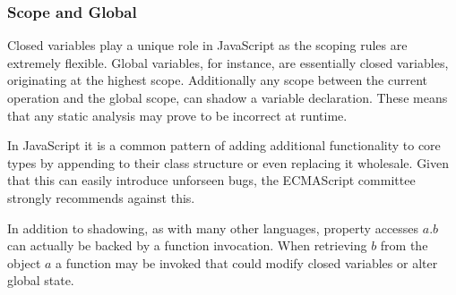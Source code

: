 \subsubsection{Scope and Global}

Closed variables play a unique role in JavaScript as the scoping rules are extremely flexible.  Global variables, for instance, are essentially closed variables, originating at the highest scope.  Additionally any scope between the current operation and the global scope, can shadow a variable declaration.  These means that any static analysis may prove to be incorrect at runtime.  

In JavaScript it is a common pattern of adding additional functionality to core types by appending to their class structure or even replacing it wholesale.  Given that this can easily introduce unforseen bugs, the ECMAScript committee strongly recommends against this. %

In addition to shadowing, as with many other languages, property accesses $a.b$ can actually be backed by a function invocation.  When retrieving $b$ from the object $a$ a function may be invoked that could modify closed variables or alter global state.  